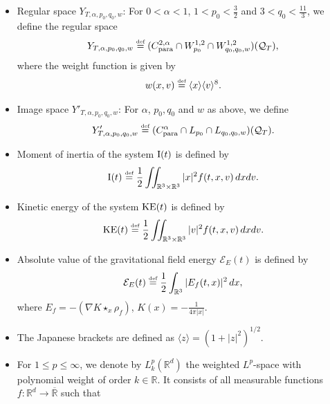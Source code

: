 \documentclass[reqno,11pt,final]{amsart}
\theoremstyle{plain}
\numberwithin{equation}{section}
\numberwithin{theorem}{section}
\newcommand{\eqdef }{\overset{\mbox{\tiny{def}}}{=}}
\begin{document}
\begin{itemize}
\begin{align*}
            \lVert f\rVert_{X_T^m} \eqdef \lVert \langle x-vt\rangle^m\langle v\rangle^m f(t,x,v)\rVert_{L^\infty(\overline{\mathcal{Q}_T})},
    \end{align*}where $W_{p_0}^{1,2}$ and $W_{q_0,w}^{1,2}$ are the (weighted) parabolic Sobolev spaces defined as in \eqref{def.para.sob}.
\item \label{reg space}Regular space $Y_{T,\alpha,p_0,q_0,w}$: For $0<\alpha< 1$, $1<p_0<\frac{3}{2}$ and $3<q_0<\frac{11}{3} $, we define the regular space
\begin{align*}
Y_{T,\alpha,p_0,q_0,w} \eqdef (C_\textup{para}^{2,\alpha} \cap W_{p_0}^{1,2} \cap W^{1,2}_{q_0, q_0, w})(\mathcal{Q}_T),
\end{align*}where the weight function is given by
\begin{align*}
w(x,v) \eqdef \langle x\rangle \langle v\rangle^8.
\end{align*}
\item Image space $Y'_{T,\alpha,p_0,q_0,w}$: For $\alpha$, $p_0,q_0$ and $w$ as above, we define
\begin{align*}
Y'_{T,\alpha,p_0,q_0,w} \eqdef (C_\textup{para}^\alpha \cap L_{p_0} \cap L_{q_0, q_0, w})(\mathcal{Q}_T).
\end{align*}
\item Moment of inertia of the system $\textup{I}(t)$ is defined by
\begin{align*}
\textup{I}(t) \eqdef \frac{1}{2}\iint_{\mathbb{R}^3\times\mathbb{R}^3} |x|^2f(t,x,v)\,dxdv.
\end{align*}
\item Kinetic energy of the system $\textup{KE}(t)$ is defined by
\begin{align}\label{kinetic energy}
\textup{KE}(t) \eqdef \frac{1}{2}\iint_{\mathbb{R}^3\times\mathbb{R}^3} |v|^2f(t,x,v)\,dxdv.
\end{align}
\item Absolute value of the gravitational field energy $\mathcal{E}_E(t)$ is defined by
\begin{align*}
    \mathcal{E}_E(t) \eqdef \frac{1}{2}\int_{\mathbb{R}^3}|E_f(t,x)|^2\,dx,
\end{align*}where $E_f = -(\nabla K\star_x\rho_f)$, $K(x)=-\frac{1}{4\pi|x|}$.
\item The Japanese brackets are defined as $\langle z\rangle = (1+|z|^2)^{1/2}$.
\item For $1\le p\le \infty$, we denote by $L^p_k(\mathbb{R}^d)$ the weighted $L^p$-space with polynomial weight of order $k\in\mathbb{R}$. It consists of all measurable functions $f : \mathbb{R}^d\to\overline{\mathbb{R}}$ such that

\end{itemize}
\end{document}
